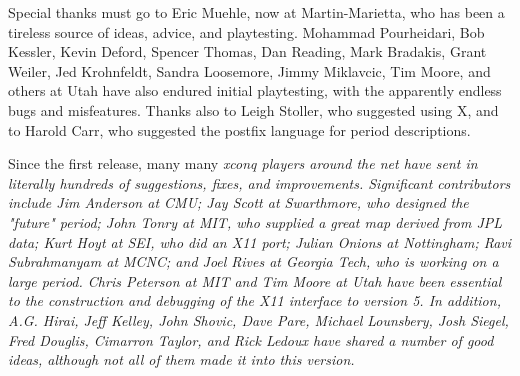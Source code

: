 \par\noindent
Special thanks must go to Eric Muehle, now at Martin-Marietta, who has been
a tireless source of ideas, advice, and playtesting.
Mohammad Pourheidari, Bob Kessler, Kevin Deford, Spencer Thomas, Dan Reading,
Mark Bradakis, Grant Weiler, Jed Krohnfeldt, Sandra Loosemore, Jimmy
Miklavcic, Tim Moore, and others
at Utah have also endured
initial playtesting, with the apparently endless bugs and
misfeatures.  Thanks also to Leigh Stoller, who suggested using X,
and to Harold Carr, who suggested the postfix language for period
descriptions.
\par\noindent
Since the first release, many many %
\it xconq \rm%
players around the net have sent
in literally hundreds of suggestions, fixes, and improvements.
Significant contributors include Jim Anderson at CMU; Jay Scott at Swarthmore,
who designed the "future" period; John Tonry at MIT, who supplied a great
map derived from JPL data; Kurt Hoyt at SEI, who did an X11 port; Julian
Onions at Nottingham;  Ravi Subrahmanyam at MCNC;  and Joel Rives at Georgia
Tech, who is working on a large period.
Chris Peterson at MIT and Tim Moore at Utah have been essential
to the construction and debugging of the X11 interface to version 5.
In addition, A.G. Hirai, Jeff Kelley, John Shovic, Dave Pare, Michael
Lounsbery, Josh Siegel, Fred Douglis, Cimarron Taylor,
and Rick Ledoux have shared
a number of good ideas, although not all of them made it into this version.

